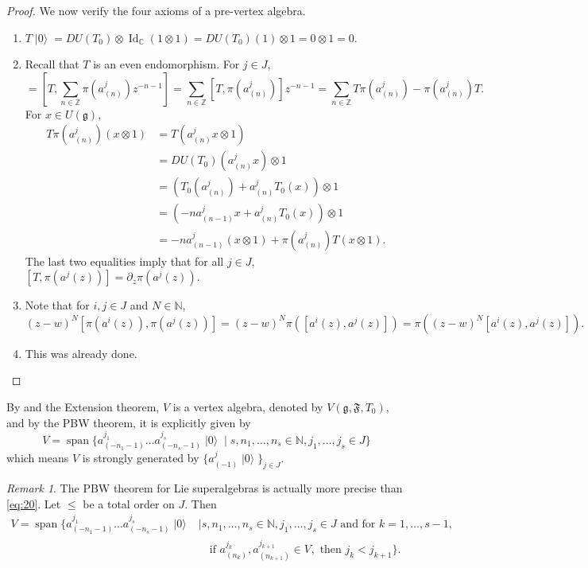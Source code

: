 \documentclass[a4paper, 12pt, reqno]{amsart}
\theoremstyle{remark}
\newtheorem{remark}[theorem]{Remark}
\numberwithin{equation}{subsection}
\DeclareMathOperator{\Id}{Id}
\DeclareMathOperator{\vspan}{span}
\DeclareMathOperator{\vac}{|0\rangle}
\DeclareMathOperator{\one}{\overline{1}}
\begin{document}
\begin{proof}
  We now verify the four axioms of a pre-vertex algebra.
  \begin{enumerate}
  \item $T\vac = DU(T_0)\otimes \Id_{\mathbb{C}}(1\otimes1) = DU(T_0)(1)\otimes1 = 0\otimes1 = 0$.
  \item Recall that $T$ is an even endomorphism.
    For $j \in J$,
    \begin{equation*}
      [T, \pi(a^j(z))] = \left[T, \sum_{n \in \mathbb{Z}}\pi(a^j_{(n)})z^{-n - 1}\right] = \sum_{n \in \mathbb{Z}}[T, \pi(a^j_{(n)})]z^{-n - 1} = \sum_{n \in \mathbb{Z}}T\pi(a^j_{(n)}) - \pi(a^j_{(n)})T.
    \end{equation*}
    For $x \in U(\mathfrak{g})$,
    \begin{align*}
      T\pi(a^j_{(n)})(x\otimes1) &= T(a^j_{(n)}x\otimes1) \\
      &= DU(T_0)(a^j_{(n)}x)\otimes1 \\
      &= (T_0(a^j_{(n)}) + a^j_{(n)}T_0(x))\otimes1 \\
      &= (-na^j_{(n - 1)}x + a^j_{(n)}T_0(x))\otimes1 \\
      &= -na^j_{(n - 1)}(x\otimes1) + \pi(a^j_{(n)})T(x\otimes 1).
    \end{align*}
    The last two equalities imply that for all $j \in J$, $[T, \pi(a^j(z))] = \partial_z\pi(a^j(z))$.
  \item Note that for $i, j \in J$ and $N \in \mathbb{N}$,
    \begin{equation*}
      (z - w)^N[\pi(a^i(z)), \pi(a^j(z))] = (z - w)^N\pi([a^i(z), a^j(z)]) = \pi((z - w)^N[a^i(z), a^j(z)]).
    \end{equation*}
  \item This was already done. \qedhere
  \end{enumerate}
\end{proof}

By  and the Extension theorem, $V$ is a vertex algebra, denoted by $V(\mathfrak{g}, \mathfrak{F}, T_0)$, and by the PBW theorem, it is explicitly given by
\begin{equation}
  \label{eq:20}
  V = \vspan\{a^{j_1}_{(-n_1 - 1)}\dots a^{j_s}_{(-n_s - 1)}\vac \mid s, n_1, \dots, n_s \in \mathbb{N}, j_1, \dots, j_s \in J\}
\end{equation}
which means $V$ is strongly generated by $\{a^j_{(-1)}\vac\}_{j\in J}$.

\begin{remark}
  \label{rmk:12}
  The PBW theorem for Lie superalgebras is actually more precise than \eqref{eq:20}.
  Let $\le$ be a total order on $J$.
  Then
  \begin{equation*}
    \begin{split}
      V = \vspan\{a^{j_1}_{(-n_1 - 1)}\dots a^{j_s}_{(-n_s - 1)}\vac &\mid s, n_1, \dots, n_s \in \mathbb{N}, j_1, \dots, j_s \in J\text{ and for } k = 1, \dots, s - 1,\\
      &\quad \text{if }a^{j_k}_{(n_k)},a^{j_{k + 1}}_{(n_{k + 1})}\in V_{\one},\text{ then }j_k < j_{k + 1}\}.
    \end{split}
  \end{equation*}
\end{remark}
\end{document}
